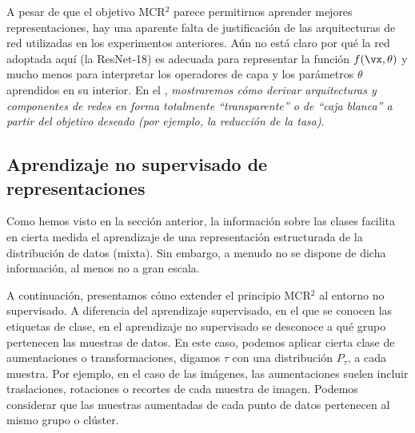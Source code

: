 \documentclass[../../book-main.tex]{subfiles}
\begin{document}
A pesar de que el objetivo MCR$^2$ parece permitirnos
aprender mejores representaciones, hay una aparente falta de
justificación de las arquitecturas de red utilizadas en los experimentos
anteriores. Aún no está claro por qué la red adoptada aquí (la
ResNet-18) es adecuada para representar la función $f(\vx, \theta)$ y mucho
menos para interpretar los operadores de capa y los parámetros $\theta$
aprendidos en su interior. En el , {\em mostraremos
    cómo derivar arquitecturas y componentes de redes en forma totalmente
``transparente'' o de ``caja blanca'' a partir del objetivo deseado (por ejemplo, la reducción de la tasa)}.

\subsection{Aprendizaje no supervisado de representaciones}
\label{sec:SimDINO}

Como hemos visto en la sección anterior, la información sobre las clases facilita
en cierta medida el aprendizaje de una representación estructurada de la distribución de datos (mixta).
Sin embargo, a menudo no se dispone de dicha información, al
menos no a gran escala.

A continuación, presentamos cómo extender el principio MCR$^2$ al
entorno no supervisado. A diferencia del aprendizaje supervisado, en el que se conocen las
etiquetas de clase, en el aprendizaje no supervisado se desconoce a qué grupo
pertenecen las muestras de datos. En este caso, podemos aplicar cierta
clase de aumentaciones o transformaciones, digamos $\tau$ con una
distribución $P_{\tau}$, a cada muestra. Por ejemplo, en el caso de las imágenes,
las aumentaciones suelen incluir traslaciones, rotaciones o recortes
de cada muestra de imagen. Podemos considerar que las muestras aumentadas de cada punto de datos
pertenecen al mismo grupo o clúster.
\end{document}
